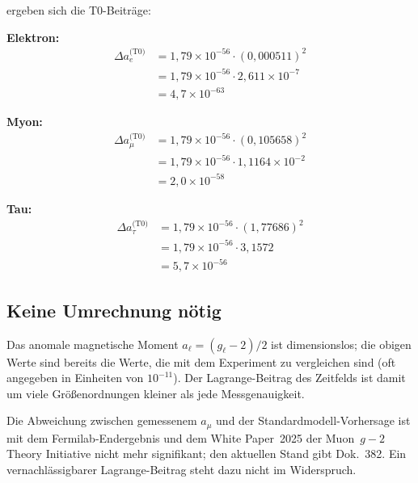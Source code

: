 	ergeben sich die T0-Beiträge:

	\textbf{Elektron:}
	\begin{equation}
		\begin{split}
			\Delta a_e^{\text{(T0)}} &= 1{,}79 \times 10^{-56} \cdot (0{,}000511)^2 \\
			&= 1{,}79 \times 10^{-56} \cdot 2{,}611 \times 10^{-7} \\
			&= 4{,}7 \times 10^{-63}
		\end{split}
		\label{eq:electron_prediction}
	\end{equation}

	\textbf{Myon:}
	\begin{equation}
		\begin{split}
			\Delta a_\mu^{\text{(T0)}} &= 1{,}79 \times 10^{-56} \cdot (0{,}105658)^2 \\
			&= 1{,}79 \times 10^{-56} \cdot 1{,}1164 \times 10^{-2} \\
			&= 2{,}0 \times 10^{-58}
		\end{split}
		\label{eq:muon_prediction}
	\end{equation}

	\textbf{Tau:}
	\begin{equation}
		\begin{split}
			\Delta a_\tau^{\text{(T0)}} &= 1{,}79 \times 10^{-56} \cdot (1{,}77686)^2 \\
			&= 1{,}79 \times 10^{-56} \cdot 3{,}1572 \\
			&= 5{,}7 \times 10^{-56}
		\end{split}
		\label{eq:tau_prediction}
	\end{equation}

	\subsection{Keine Umrechnung nötig}

	Das anomale magnetische Moment $a_\ell = (g_\ell - 2)/2$ ist dimensionslos; die obigen Werte sind bereits die Werte, die mit dem Experiment zu vergleichen sind (oft angegeben in Einheiten von $10^{-11}$). Der Lagrange-Beitrag des Zeitfelds ist damit um viele Größenordnungen kleiner als jede Messgenauigkeit.

	Die Abweichung zwischen gemessenem $a_\mu$ und der Standardmodell-Vorhersage ist mit dem Fermilab-Endergebnis und dem White Paper~2025 der Muon~$g-2$ Theory Initiative nicht mehr signifikant; den aktuellen Stand gibt Dok.~382. Ein vernachlässigbarer Lagrange-Beitrag steht dazu nicht im Widerspruch.

